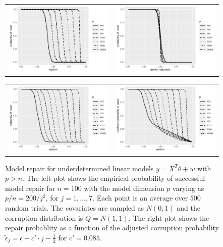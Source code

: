 \begin{figure}[ht]
  \begin{center}
    \begin{tabular}{cc}
      \includegraphics[width=.47\textwidth]{fig/plot-linear-100} &
      \includegraphics[width=.47\textwidth]{fig/plot-linear-100-adj}\\[-10pt]
    \end{tabular}
    \caption{Model repair for underdetermined linear models $y=X^T\theta + w$ with $p>n$. The left plot shows the empirical probability of successful model repair for $n=100$ with the model dimension $p$
    varying as $p/n = 200 /j^2$, for $j=1,\ldots, 7$. Each point is an average over 500 random trials. The covariates are sampled as $N(0,1)$ and the corruption distribution is $Q=N(1,1)$. The right plot shows the repair probablity as a function
    of the adjusted corruption probability $\tilde\epsilon_j = \epsilon + c'\cdot j - \frac{1}{2}$ for $c'=0.085$.}
    \label{fig:exp1}
    \vskip10pt
    \begin{tabular}{cc}
      \includegraphics[width=.47\textwidth]{fig/plot-linear-total-50} &
      \includegraphics[width=.47\textwidth]{fig/plot-linear-sum-50}\\[-10pt]

\end{tabular}
\end{center}
\end{figure}

